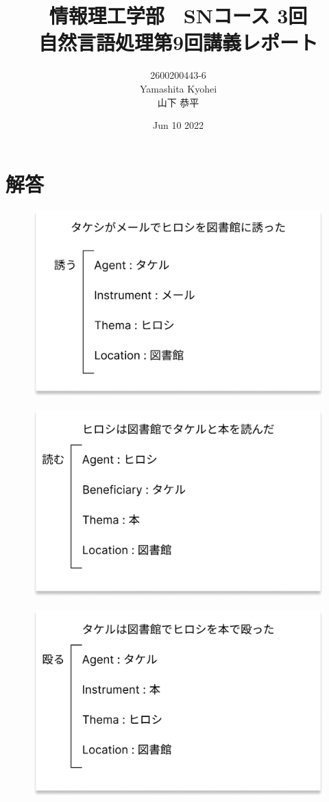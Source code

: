 \documentclass[dvipdfmx,autodetect-engine,titlepage]{jsarticle}
\title{情報理工学部　SNコース 3回\\
自然言語処理第9回講義レポート\\}
\author{2600200443-6\\Yamashita Kyohei\\山下 恭平}
\date{Jun 10 2022}
\begin{document}
\maketitle

\section{解答}


\begin{figure}[h]
  \centering
  \includegraphics[scale=0.7]{Frame1.png}
\end{figure}

\begin{figure}[h]
  \centering
  \includegraphics[scale=0.7]{Frame2.png}
\end{figure}

\begin{figure}[h]
  \centering
  \includegraphics[scale=0.7]{Frame3.png}
\end{figure}
\end{document}
